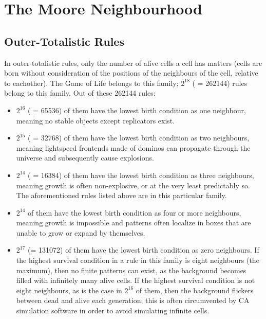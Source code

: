 \documentclass[
	11pt, %
	fleqn, %
	a4paper, %
]{LegrandOrangeBook}
\begin{document}
{\chapter{The Moore Neighbourhood}
\section{Outer-Totalistic Rules}
In outer-totalistic rules, only the number of alive cells a cell has matters (cells are born without consideration of the positions of the neighbours of the cell, relative to eachother). The Game of Life belongs to this family; $2^{18}$ ( = 262144) rules belong to this family. Out of these 262144 rules:
\begin{itemize}
	\item $2^{16}$ ( = 65536) of them have the lowest birth condition as one neighbour, meaning no stable objects except replicators exist.
	\item $2^{15}$ ( = 32768) of them have the lowest birth condition as two neighbours, meaning lightspeed frontends made of dominos can propagate through the universe and subsequently cause explosions.
	\item $2^{14}$ ( = 16384) of them have the lowest birth condition as three neighbours, meaning growth is often non-explosive, or at the very least predictably so. The aforementioned rules listed above are in this particular family.
	\item $2^{14}$ of them have the lowest birth condition as four or more neighbours, meaning growth is impossible and patterns often localize in boxes that are unable to grow or expand by themselves.
	\item $2^{17}$ (= 131072) of them have the lowest birth condition as zero neighbours. If the highest survival condition in a rule in this family is eight neighbours (the maximum), then no finite patterns can exist, as the background becomes filled with infinitely many alive cells. If the highest survival condition is not eight neighbours, as is the case in $2^{16}$ of them, then the background flickers between dead and alive each generation; this is often circumvented by CA simulation software in order to avoid simulating infinite cells.
\end{itemize} 



\stopcontents[part] %

}
\end{document}
